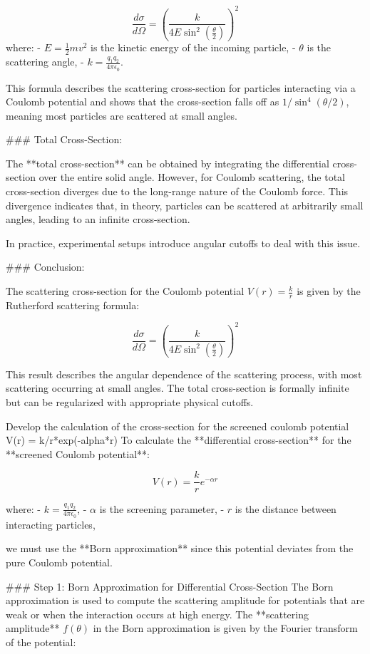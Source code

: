    \[
   \frac{d\sigma}{d\Omega} = \left( \frac{k}{4 E \sin^2\left(\frac{\theta}{2}\right)} \right)^2
   \]
   where:
   - \( E = \frac{1}{2} mv^2 \) is the kinetic energy of the incoming particle,
   - \( \theta \) is the scattering angle,
   - \( k = \frac{q_1 q_2}{4 \pi \epsilon_0} \).

   This formula describes the scattering cross-section for particles interacting via a Coulomb potential and shows that the cross-section falls off as \( 1/\sin^4(\theta/2) \), meaning most particles are scattered at small angles.

### Total Cross-Section:

The **total cross-section** can be obtained by integrating the differential cross-section over the entire solid angle. However, for Coulomb scattering, the total cross-section diverges due to the long-range nature of the Coulomb force. This divergence indicates that, in theory, particles can be scattered at arbitrarily small angles, leading to an infinite cross-section.

In practice, experimental setups introduce angular cutoffs to deal with this issue.

### Conclusion:

The scattering cross-section for the Coulomb potential \( V(r) = \frac{k}{r} \) is given by the Rutherford scattering formula:

\[
\frac{d\sigma}{d\Omega} = \left( \frac{k}{4 E \sin^2\left(\frac{\theta}{2}\right)} \right)^2
\]

This result describes the angular dependence of the scattering process, with most scattering occurring at small angles. The total cross-section is formally infinite but can be regularized with appropriate physical cutoffs.

Develop the calculation of the cross-section for the screened coulomb potential V(r) = k/r*exp(-alpha*r)
To calculate the **differential cross-section** for the **screened Coulomb potential**:

\[
V(r) = \frac{k}{r} e^{-\alpha r}
\]

where:
- \( k = \frac{q_1 q_2}{4\pi \epsilon_0} \),
- \( \alpha \) is the screening parameter, 
- \( r \) is the distance between interacting particles,

we must use the **Born approximation** since this potential deviates from the pure Coulomb potential.

### Step 1: Born Approximation for Differential Cross-Section
The Born approximation is used to compute the scattering amplitude for potentials that are weak or when the interaction occurs at high energy. The **scattering amplitude** \( f(\theta) \) in the Born approximation is given by the Fourier transform of the potential:

